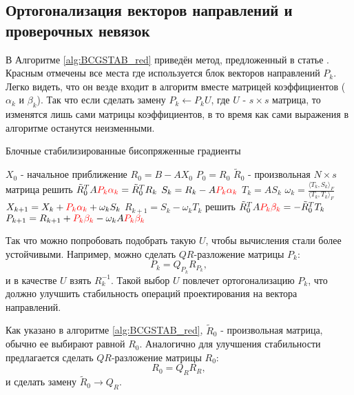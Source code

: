 \subsection{Ортогонализация векторов направлений и проверочных невязок}

В Алгоритме \ref{alg:BCGSTAB_red} приведён метод, предложенный в статье \cite{elGuennouni2003}. Красным отмечены
все места где используется блок векторов направлений $P_k$. Легко видеть, что он везде
входит в алгоритм вместе матрицей коэффициентов ($\alpha_k$ и $\beta_k$). Так что если сделать замену
$P_k \gets P_k U$, где $U$ - $s \times s$ матрица, то изменятся лишь сами матрицы коэффициентов,
в то время как сами выражения в алгоритме останутся неизменными.       
\begin{algorithm}[H]
    \caption{Блочные стабилизированные бисопряженные градиенты}\label{alg:BCGSTAB_red}
    \begin{algorithmic}
    \State $X_0$ - начальное приближение
    \State $R_0 = B - AX_0$
    \State $P_0 = R_0$
    \State $\tilde{R}_0$ - произвольная $N \times s$ матрица
        \State решить $\tilde{R}_0^TA {\color{red}P_k\alpha_k} = \tilde{R}_0^TR_k$
        \State $S_k=R_k-A{\color{red}P_k\alpha_k}$
        \State $T_k=AS_k$
        \State $\omega_k = \frac{\langle T_k,S_k\rangle_F}{\langle T_k, T_k\rangle_F}$
        \State $X_{k+1}=X_k + {\color{red}P_k\alpha_k} + \omega_kS_k$
        \State $R_{k+1} = S_k - \omega_k T_k$
        \State решить $\tilde{R}_0^TA{\color{red}P_k\beta_k} = -\tilde{R}_0^TT_k$
        \State $P_{k+1}=R_{k+1} + {\color{red}P_k\beta_k} - \omega_k A{\color{red}P_k\beta_k}$
    \EndFor  
    \end{algorithmic}
\end{algorithm}
Так что можно попробовать подобрать такую $U$, чтобы вычисления стали более устойчивыми. Например, можно 
сделать $QR$-разложение матрицы $P_k$:
$$P_k = Q_{P_{k}} R_{P_{k}},$$
и в качестве $U$ взять $R_k^{-1}$. Такой выбор $U$ повлечет ортогонализацию $P_k$, что должно улучшить стабильность
операций проектирования на вектора направлений.
\par Как указано в алгоритме \ref{alg:BCGSTAB_red}, $\tilde{R}_0$ - произвольная матрица, обычно ее выбирают равной
$R_0$. Аналогично для улучшения стабильности предлагается сделать $QR$-разложение матрицы
$R_0$:
$$R_0 = Q_R R_R,$$
и сделать замену $\tilde{R}_0 \rightarrow Q_R$.

